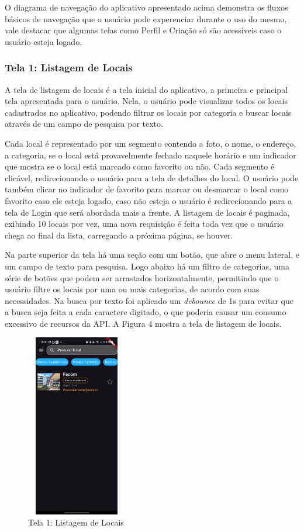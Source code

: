     O diagrama de navegação do aplicativo apresentado acima demonstra os fluxos básicos de navegação que o usuário pode experenciar
    durante o uso do mesmo, vale destacar que algumas telas como Perfil e Criação só são acessíveis caso o usuário esteja logado.

    \FloatBarrier

\subsubsection{Tela 1: Listagem de Locais}

    A tela de listagem de locais é a tela inicial do aplicativo, a primeira e principal tela apresentada para o usuário. Nela, o usuário pode visualizar todos os locais cadastrados no aplicativo, podendo filtrar os locais por categoria e buscar locais através de um campo de pesquisa por texto. 
    
    Cada local é representado por um segmento contendo a foto, o nome, o endereço, a categoria, se o local está provavelmente fechado naquele horário e um indicador que mostra se o local está marcado como favorito ou não. Cada segmento é clicável, redirecionando o usuário para a tela de detalhes do local. O usuário pode também clicar no indicador de favorito para marcar ou desmarcar o local como favorito caso ele esteja logado, caso não esteja o usuário é redirecionando para a tela de Login que será abordada mais a frente. A listagem de locais é paginada, exibindo 10 locais por vez, uma nova requisição é feita toda vez que o usuário chega ao final da lista, carregando a próxima página, se houver.

    Na parte superior da tela há uma seção com um botão, que abre o menu lateral, e um campo de texto para pesquisa. Logo abaixo há um filtro de categorias, uma série de botões que podem ser arrastados horizontalmente, permitindo que o usuário filtre os locais por uma ou mais categorias, de acordo com suas necessidades. Na busca por texto foi aplicado um \textit{debounce} de 1s para evitar que a busca seja feita a cada caractere digitado, o que poderia causar um consumo excessivo de recursos da API. A Figura 4 mostra a tela de listagem de locais.

    \begin{figure}[h]
        \centering
        \includegraphics[width=44mm,height=80mm]{imagens/inicial.jpg}
        \caption{\scriptsize Tela 1: Listagem de Locais}
        \label{fig:tela1}
    \end{figure}

